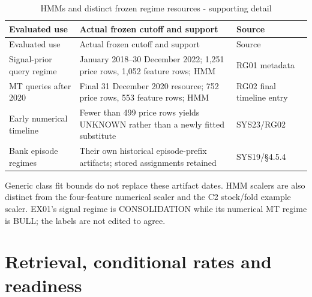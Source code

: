 \begin{longtable}[]{@{}
  >{\raggedright\arraybackslash}p{}
  >{\raggedright\arraybackslash}p{}
  >{\raggedright\arraybackslash}p{}@{}}
\caption{HMMs and distinct frozen regime resources - supporting detail}\label{tab:C_configuration:4}\tabularnewline
\toprule\noalign{}
Evaluated use
 & Actual frozen cutoff and support
 & Source
 \\
\midrule\noalign{}
\endfirsthead
\toprule\noalign{}
Evaluated use
 & Actual frozen cutoff and support
 & Source
 \\
\midrule\noalign{}
\endhead
\bottomrule\noalign{}
\endlastfoot
Signal-prior query regime & 2 January 2018--30 December 2022; 1,251 price rows, 1,052 feature rows; HMM & RG01 metadata \\
MT queries after 2020 & Final 31 December 2020 resource; 752 price rows, 553 feature rows; HMM & RG02 final timeline entry \\
Early numerical timeline & Fewer than 499 price rows yields UNKNOWN rather than a newly fitted substitute & SYS23/RG02 \\
Bank episode regimes & Their own historical episode-prefix artifacts; stored assignments retained & SYS19/§4.5.4 \\
\end{longtable}

\endgroup

Generic class fit bounds do not replace these artifact dates. HMM scalers
are also distinct from the four-feature numerical scaler and the C2
stock/fold example scaler. EX01's signal regime is CONSOLIDATION while
its numerical MT regime is BULL; the labels are not edited to agree.

\section{Retrieval, conditional rates and readiness}\label{s:2e2fff58a6ae9628}

\begingroup
\small
{}
\setlength{\tabcolsep}{3pt}

